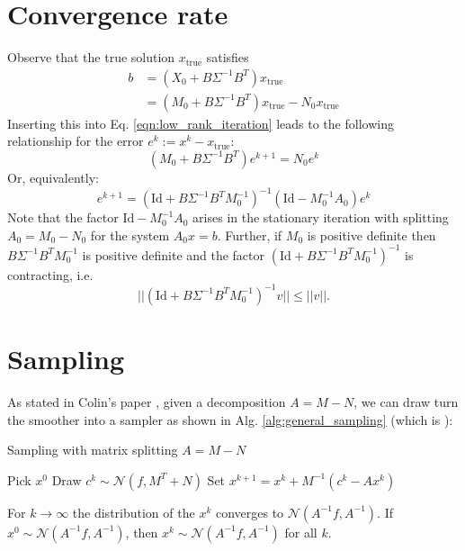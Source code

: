 \documentclass[11pt]{article}
\newcommand{\xtrue}{x_{\text{true}}}
\begin{document}
\section{Convergence rate}
Observe that the true solution $\xtrue$ satisfies
\begin{equation}
    \begin{aligned}
        b & = (X_0 + B\Sigma^{-1}B^T)\xtrue               \\
          & = (M_0 + B\Sigma^{-1}B^T) \xtrue - N_0 \xtrue
    \end{aligned}
\end{equation}
Inserting this into Eq. \eqref{eqn:low_rank_iteration} leads to the following relationship for the error $e^k:= x^k-\xtrue$:
\begin{equation}
    (M_0 + B\Sigma^{-1}B^T)e^{k+1} = N_0 e^k
\end{equation}
Or, equivalently:
\begin{equation}
    e^{k+1} = \left(\text{Id} + B\Sigma^{-1}B^T M_0^{-1}\right)^{-1} \left(\text{Id}-M_0^{-1}A_0\right) e^k
\end{equation}
Note that the factor $\text{Id} - M_0^{-1}A_0$ arises in the stationary iteration with splitting $A_0=M_0-N_0$ for the system $A_0x=b$. Further, if $M_0$ is positive definite then $B\Sigma^{-1}B^T M_0^{-1}$ is positive definite and the factor $\left(\text{Id} + B\Sigma^{-1}B^T M_0^{-1}\right)^{-1}$ is contracting, i.e.
\begin{equation}
  ||\left(\text{Id} + B\Sigma^{-1}B^T M_0^{-1}\right)^{-1}v||\le ||v||.
\end{equation}
\section{Sampling}
As stated in Colin's paper \cite{Fox2017}, given a decomposition $A=M-N$, we can draw turn the smoother into a sampler as shown in Alg. \ref{alg:general_sampling} (which is \cite[Algorithm 5]{Fox2017}):
\begin{algorithm}
    \caption{Sampling with matrix splitting $A=M-N$}\label{alg:general_sampling}
    \begin{algorithmic}[1]
        \State Pick $x^0$
        \State Draw $c^k\sim\mathcal{N}(f,M^T+N)$
        \State Set $x^{k+1} = x^{k} + M^{-1}\left(c^k - Ax^k \right)$
        \EndFor
    \end{algorithmic}
\end{algorithm}
For $k\rightarrow \infty$ the distribution of the $x^k$ converges to $\mathcal{N}(A^{-1}f,A^{-1})$. If $x^0\sim\mathcal{N}(A^{-1}f,A^{-1})$, then $x^k\sim \mathcal{N}(A^{-1}f,A^{-1})$ for all $k$.
\end{document}
